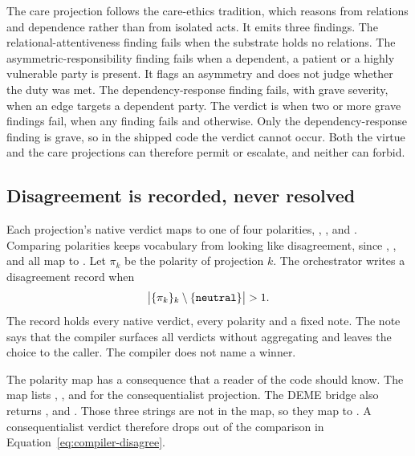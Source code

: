 The care projection follows the care-ethics tradition, which reasons from relations and dependence
rather than from isolated acts. It emits three findings. The relational-attentiveness finding
fails when the substrate holds no relations. The asymmetric-responsibility finding fails when a
dependent, a patient or a highly vulnerable party is present. It flags an asymmetry and does not
judge whether the duty was met. The dependency-response finding fails, with grave severity, when an
 edge targets a dependent party. The verdict is  when two or more
grave findings fail,  when any finding fails and 
otherwise. Only the dependency-response finding is grave, so in the shipped code the
 verdict cannot occur. Both the virtue and the care projections can therefore
permit or escalate, and neither can forbid.

\subsection{Disagreement is recorded, never resolved}

Each projection's native verdict maps to one of four polarities, , ,
 and . Comparing polarities keeps vocabulary from looking like
disagreement, since , ,  and  all map
to . Let $\pi_k$ be the polarity of projection $k$. The orchestrator writes a
disagreement record when
\begin{equation}
\bigl|\{\pi_k\}_k \setminus \{\texttt{neutral}\}\bigr| > 1 .
\label{eq:compiler-disagree}
\end{equation}
The record holds every native verdict, every polarity and a fixed note. The note says that the
compiler surfaces all verdicts without aggregating and leaves the choice to the caller. The
compiler does not name a winner.

The polarity map has a consequence that a reader of the code should know. The map lists
, ,  and
 for the consequentialist projection. The DEME bridge also returns
,  and . Those three strings are
not in the map, so they map to . A consequentialist  verdict
therefore drops out of the comparison in Equation~\eqref{eq:compiler-disagree}.

